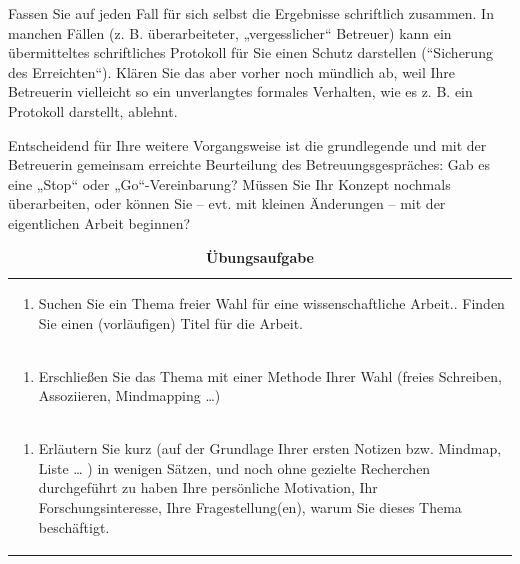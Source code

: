 \documentclass[]{book}
\providecommand{\tightlist}{%
  \setlength{\itemsep}{0pt}\setlength{\parskip}{0pt}}
\theoremstyle{definition}
\theoremstyle{definition}
\theoremstyle{definition}
\theoremstyle{remark}
\begin{document}
Fassen Sie auf jeden Fall für sich selbst die Ergebnisse schriftlich
zusammen. In manchen Fällen (z. B. überarbeiteter, „vergesslicher``
Betreuer) kann ein übermitteltes schriftliches Protokoll für Sie einen
Schutz darstellen (``Sicherung des Erreichten``). Klären Sie das aber
vorher noch mündlich ab, weil Ihre Betreuerin vielleicht so ein
unverlangtes formales Verhalten, wie es z. B. ein Protokoll darstellt,
ablehnt.

Entscheidend für Ihre weitere Vorgangsweise ist die grundlegende und mit
der Betreuerin gemeinsam erreichte Beurteilung des Betreuungsgespräches:
Gab es eine „Stop`` oder „Go``-Vereinbarung? Müssen Sie Ihr Konzept
nochmals überarbeiten, oder können Sie -- evt. mit kleinen Änderungen --
mit der eigentlichen Arbeit beginnen?

\begin{longtable}[]{@{}l@{}}
\caption{\textbf{\label{tab:aufgabe} Übungsaufgabe}}\tabularnewline
\toprule
\begin{minipage}[t]{0.97\columnwidth}\raggedright\strut
\begin{enumerate}
\def\labelenumi{\arabic{enumi}.}
\tightlist
\item
  Suchen Sie ein Thema freier Wahl für eine wissenschaftliche Arbeit..
  Finden Sie einen (vorläufigen) Titel für die Arbeit.
\end{enumerate}\strut
\end{minipage}\tabularnewline
\begin{minipage}[t]{0.97\columnwidth}\raggedright\strut
\begin{enumerate}
\def\labelenumi{\arabic{enumi}.}
\setcounter{enumi}{1}
\tightlist
\item
  Erschließen Sie das Thema mit einer Methode Ihrer Wahl (freies
  Schreiben, Assoziieren, Mindmapping \ldots{})
\end{enumerate}\strut
\end{minipage}\tabularnewline
\begin{minipage}[t]{0.97\columnwidth}\raggedright\strut
\begin{enumerate}
\def\labelenumi{\arabic{enumi}.}
\setcounter{enumi}{2}
\tightlist
\item
  Erläutern Sie kurz (auf der Grundlage Ihrer ersten Notizen bzw.
  Mindmap, Liste \ldots{} ) in wenigen Sätzen, und noch ohne gezielte
  Recherchen durchgeführt zu haben Ihre persönliche Motivation, Ihr
  Forschungsinteresse, Ihre Fragestellung(en), warum Sie dieses Thema
  beschäftigt.
\end{enumerate}\strut

\end{minipage}
\end{longtable}
\end{document}
